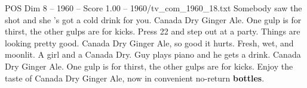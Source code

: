 \begin{textsample}{POS Dim 8 – 1960 – Score 1.00 – 1960/tv\_com\_1960\_18.txt}  \label{ex:f8_pos_064}
Somebody saw the shot and she 's got a cold drink for you.
Canada Dry Ginger Ale.
One gulp is for thirst, the other gulps are for kicks.
Press 22 and step out at a party.
Things are looking pretty good.
Canada Dry Ginger Ale, so good it hurts.
Fresh, wet, and moonlit.
A girl and a Canada Dry.
Guy plays piano and he gets a drink.
Canada Dry Ginger Ale.
One gulp is for thirst, the other gulps are for kicks.
Enjoy the taste of Canada Dry Ginger Ale, now in convenient no-return \textbf{bottles}.

\end{textsample}
